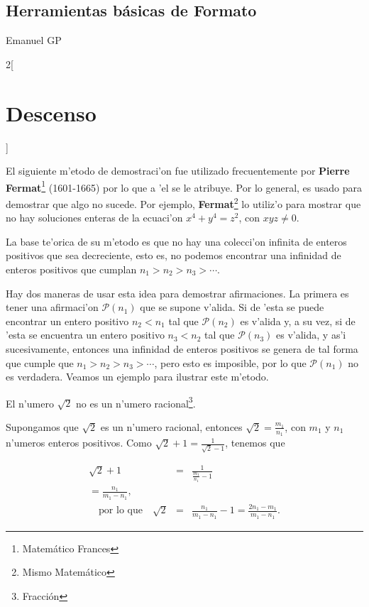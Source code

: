 \documentclass[spanish,12pt]{article}
\date{\today}
\begin{document}
\begin{center}
\section*{Herramientas b\'asicas de Formato}
Emanuel GP
\end{center}

\begin{flushright}
\thedate
\end{flushright}

\begin{multicols}{2}[\section{Descenso}]{
El siguiente m'etodo de demostraci'on fue utilizado frecuentemente 
por {\bf Pierre Fermat}\footnote{Matem\'atico Frances} (1601-1665) por lo que a 'el se le atribuye. Por lo general, 
es usado para demostrar que algo no sucede. 
Por ejemplo, {\bf Fermat}\footnote{Mismo Matem\'atico} lo utiliz'o
para mostrar que no hay soluciones enteras de la ecuaci'on $x^4 + y^4=z^2$, 
con $xyz\neq 0$.


La base te'orica de su m'etodo es que no hay una colecci'on 
infinita de enteros positivos que sea decreciente, esto es, no podemos 
encontrar una infinidad de enteros positivos que cumplan 
$n_1 > n_2 > n_3>\cdots$.

\noindent Hay dos maneras de usar esta idea para demostrar afirmaciones. 
La primera es tener una afirmaci'on $\mathcal{P}(n_1)$ que se supone v'alida. 
Si de 'esta se puede encontrar un entero positivo $n_2 <n_1$ tal que  
$\mathcal{P}(n_2)$ es v'alida y, a su vez, si de 'esta se encuentra un 
entero positivo $n_3< n_2$ tal que  $\mathcal{P}(n_3)$ es v'alida, y as'i 
sucesivamente, entonces una infinidad de enteros positivos se genera de tal 
forma  que cumple que $n_1>n_2>n_3>\cdots$, pero esto es imposible, por lo 
que  $\mathcal{P}(n_1)$ no es verdadera. Veamos un ejemplo para ilustrar este 
m'etodo.}

El n'umero $\sqrt{2}$ no es un n'umero racional\footnote{Fracci\'on}.

\vspace{.2in}

\noindent Supongamos que $\sqrt 2$ es un n'umero racional, entonces 
$\sqrt 2=\frac{m_1}{n_1}$, con $m_1$ y $n_1$ n'umeros enteros positivos.
Como $\sqrt{2}+1=\frac{1}{\sqrt{2}-1}$, tenemos que

\begin{eqnarray*}		  
 \sqrt{2}+1 &=& \frac{1}{\frac{m_1}{n_1}-1}\\=\frac{n_1}{m_1-n_1},\\
 \quad\text{por lo que}\quad   \sqrt{2} &=& \frac{n_1}{m_1-n_1}-1=\frac{2n_1-m_1}{m_1-n_1}.
\end{eqnarray*}


\end{multicols}
\end{document}
